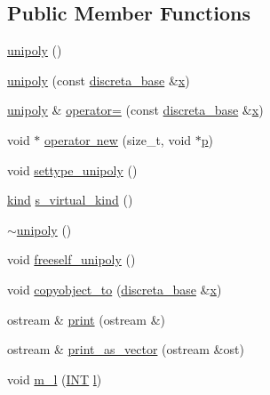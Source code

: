 \subsection*{Public Member Functions}
\begin{DoxyCompactItemize}
\item 
\mbox{\hyperlink{classunipoly_adf6c81c7b9f7d4c110a04c4a5681695c}{unipoly}} ()
\item 
\mbox{\hyperlink{classunipoly_ade3afe0b00b7ff45b9dbc5a15cacf59d}{unipoly}} (const \mbox{\hyperlink{classdiscreta__base}{discreta\+\_\+base}} \&\mbox{\hyperlink{classunipoly_a193127c4c6cf419d995882bb5b762294}{x}})
\item 
\mbox{\hyperlink{classunipoly}{unipoly}} \& \mbox{\hyperlink{classunipoly_a60f1ddf49bc3e91ad73d24b9fbb29460}{operator=}} (const \mbox{\hyperlink{classdiscreta__base}{discreta\+\_\+base}} \&\mbox{\hyperlink{classunipoly_a193127c4c6cf419d995882bb5b762294}{x}})
\item 
void $\ast$ \mbox{\hyperlink{classunipoly_a639ce1a4da795063456de370bed53ab3}{operator new}} (size\+\_\+t, void $\ast$\mbox{\hyperlink{alphabet2_8_c_a533391314665d6bf1b5575e9a9cd8552}{p}})
\item 
void \mbox{\hyperlink{classunipoly_a8db854fcc85c5e1150b1f1b1c005c95b}{settype\+\_\+unipoly}} ()
\item 
\mbox{\hyperlink{discreta_8h_aaf25ee7e2306d78c74ec7bc48f092e81}{kind}} \mbox{\hyperlink{classunipoly_a62303d2461523c791edc16fe40371e18}{s\+\_\+virtual\+\_\+kind}} ()
\item 
\mbox{\hyperlink{classunipoly_aff42843e3c959f1c5e58856784352890}{$\sim$unipoly}} ()
\item 
void \mbox{\hyperlink{classunipoly_aad315db6c6adb555a0c63877aab7d27e}{freeself\+\_\+unipoly}} ()
\item 
void \mbox{\hyperlink{classunipoly_aa856d320a499748a0f3345ab45e51910}{copyobject\+\_\+to}} (\mbox{\hyperlink{classdiscreta__base}{discreta\+\_\+base}} \&\mbox{\hyperlink{classunipoly_a193127c4c6cf419d995882bb5b762294}{x}})
\item 
ostream \& \mbox{\hyperlink{classunipoly_a9dc0d295bea73d0c20562149f250cd97}{print}} (ostream \&)
\item 
ostream \& \mbox{\hyperlink{classunipoly_a68ada9f90ad0ad39ae91653be50988aa}{print\+\_\+as\+\_\+vector}} (ostream \&ost)
\item 
void \mbox{\hyperlink{classunipoly_a776ccf5b98954c5212b684944ab5d725}{m\+\_\+l}} (\mbox{\hyperlink{galois_8h_a09fddde158a3a20bd2dcadb609de11dc}{I\+NT}} \mbox{\hyperlink{alphabet2_8_c_a89606eca6b563ec68d2da2e84657736f}{l}})

\end{DoxyCompactItemize}
